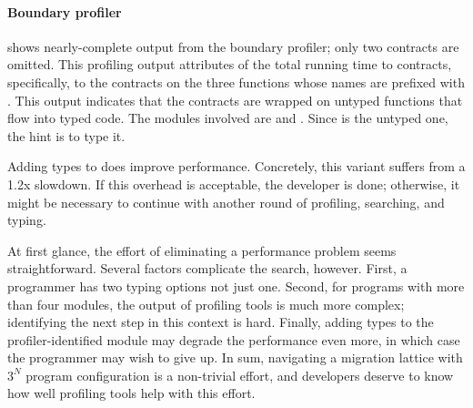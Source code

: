 \paragraph{Boundary profiler}  shows nearly-complete
output from the boundary profiler; only two contracts are omitted.  This
profiling output attributes  of the total running time to
contracts, specifically, to the contracts on the three functions whose names are
prefixed with . This output indicates that the contracts are
wrapped on untyped functions that flow into typed code. The modules involved are
 and .  Since  is the untyped one, the hint is to
type it.

Adding types to  does improve performance. Concretely, this variant
suffers from a 1.2x slowdown.  If this overhead is acceptable, the developer is
done; otherwise, it might be necessary to continue with another round of
profiling, searching, and typing.

\medskip

At first glance, the effort of eliminating a performance problem seems
straightforward. Several factors complicate the search, however. First, a
programmer has two typing options not just one. Second, for programs with more
than four modules, the output of profiling tools is much more complex;
identifying the next step in this context is hard. Finally, adding types to the
profiler-identified module may degrade the performance even more, in which case
the programmer may wish to give up. In sum, navigating a migration lattice with
$3^N$ program configuration is a non-trivial effort, and developers deserve to
know how well profiling tools help with this effort. 


